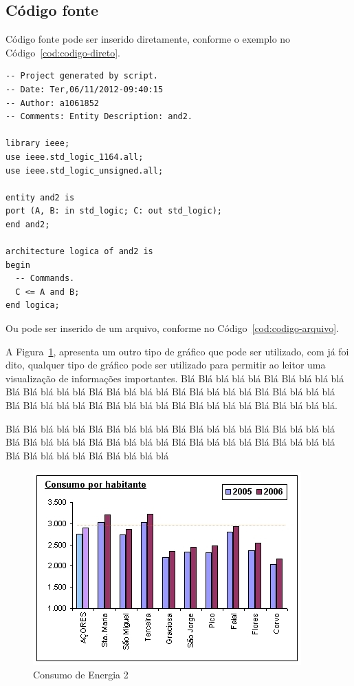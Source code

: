 \documentclass[times, 10pt,twocolumn]{article}
\begin{document}
\subsection{Código fonte}

Código fonte pode ser inserido diretamente, conforme o exemplo no Código~{\ref{cod:codigo-direto}}.

\begin{lstlisting}[label=cod:codigo-direto,caption=Descrição VHDL de uma Porta AND de duas entradas.]
-- Project generated by script.
-- Date: Ter,06/11/2012-09:40:15
-- Author: a1061852
-- Comments: Entity Description: and2.
 
library ieee;
use ieee.std_logic_1164.all;
use ieee.std_logic_unsigned.all;
 
entity and2 is
port (A, B: in std_logic; C: out std_logic);
end and2;
 
architecture logica of and2 is
begin
  -- Commands.
  C <= A and B;
end logica;
\end{lstlisting}

Ou pode ser inserido de um arquivo, conforme no Código~{\ref{cod:codigo-arquivo}}.



A Figura~{\ref{fig:figura-003}}, apresenta um outro tipo de gráfico que pode ser utilizado, com já foi dito, qualquer tipo de gráfico pode ser utilizado para permitir ao leitor uma visualização de informações importantes.
Blá Blá blá blá blá Blá Blá blá blá blá Blá Blá blá blá blá Blá Blá blá blá blá Blá Blá blá blá blá Blá Blá blá blá blá Blá Blá blá blá blá Blá Blá blá blá blá Blá Blá blá blá blá Blá Blá blá blá blá.

Blá Blá blá blá blá Blá Blá blá blá blá Blá Blá blá blá blá Blá Blá blá blá blá Blá Blá blá blá blá Blá Blá blá blá blá Blá Blá blá blá blá Blá Blá blá blá blá Blá Blá blá blá blá Blá Blá blá blá blá

\begin{figure}[*H]
    \centering
    \includegraphics[width=.5\textwidth]{figuras/consumo-2.jpg}
    \caption{Consumo de Energia 2}
    \label{fig:figura-003}
\end{figure}
\end{document}
